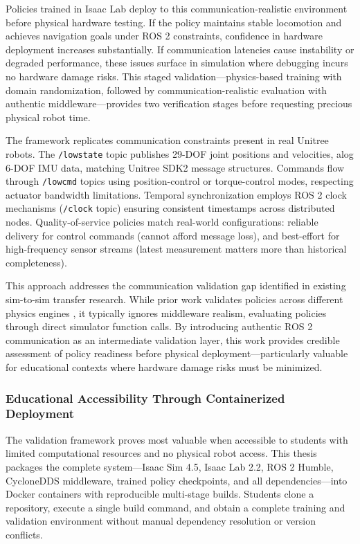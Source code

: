 \documentclass[12pt,a4paper]{article}
\begin{document}
Policies trained in Isaac Lab deploy to this communication-realistic environment before physical hardware testing. If the policy maintains stable locomotion and achieves navigation goals under ROS 2 constraints, confidence in hardware deployment increases substantially. If communication latencies cause instability or degraded performance, these issues surface in simulation where debugging incurs no hardware damage risks. This staged validation—physics-based training with domain randomization, followed by communication-realistic evaluation with authentic middleware—provides two verification stages before requesting precious physical robot time.

The framework replicates communication constraints present in real Unitree robots. The \texttt{/lowstate} topic publishes 29-DOF joint positions and velocities, alog 6-DOF IMU data, matching Unitree SDK2 message structures. Commands flow through \texttt{/lowcmd} topics using position-control or torque-control modes, respecting actuator bandwidth limitations. Temporal synchronization employs ROS 2 clock mechanisms (\texttt{/clock} topic) ensuring consistent timestamps across distributed nodes. Quality-of-service policies match real-world configurations: reliable delivery for control commands (cannot afford message loss), and best-effort for high-frequency sensor streams (latest measurement matters more than historical completeness).

This approach addresses the communication validation gap identified in existing sim-to-sim transfer research. While prior work validates policies across different physics engines \parencite{gu2024humanoidgym}, it typically ignores middleware realism, evaluating policies through direct simulator function calls. By introducing authentic ROS 2 communication as an intermediate validation layer, this work provides credible assessment of policy readiness before physical deployment—particularly valuable for educational contexts where hardware damage risks must be minimized.

\subsubsection{Educational Accessibility Through Containerized Deployment}

The validation framework proves most valuable when accessible to students with limited computational resources and no physical robot access. This thesis packages the complete system—Isaac Sim 4.5, Isaac Lab 2.2, ROS 2 Humble, CycloneDDS middleware, trained policy checkpoints, and all dependencies—into Docker containers with reproducible multi-stage builds. Students clone a repository, execute a single build command, and obtain a complete training and validation environment without manual dependency resolution or version conflicts.
\end{document}
